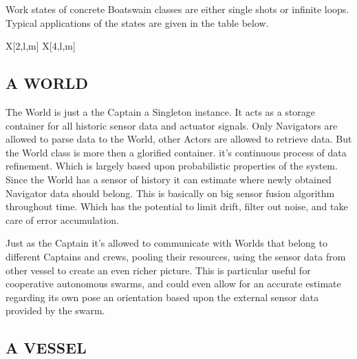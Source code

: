 \noindent Work states of concrete Boatswain classes are either single shots or infinite loops. Typical applications of
the states are given in the table below.

\begin{RoyalTable}{X[2,l,m] X[4,l,m]}
\end{RoyalTable}

\subsection{A WORLD}\label{seq:a world}

The World is just a the Captain a Singleton instance. It acts as a storage container for all historic sensor data and
actuator signals. Only Navigators are allowed to parse data to the World, other Actors are allowed to retrieve data. But
the World class is more then a glorified container. it's continuous process of data refinement. Which is largely based
upon probabilistic properties of the system. Since the World has a sensor of history it can estimate where newly
obtained Navigator data should belong. This is basically on big sensor fusion algorithm throughout time. Which has the
potential to limit drift, filter out noise, and take care of error accumulation.

Just as the Captain it's allowed to communicate with Worlds that belong to different Captains and crews, pooling their
resources, using the sensor data from other vessel to create an even richer picture. This is particular useful for
cooperative autonomous swarms, and could even allow for an accurate estimate regarding its own pose an orientation based
upon the external sensor data provided by the swarm.

\subsection{A VESSEL}\label{seq:a vessel}

